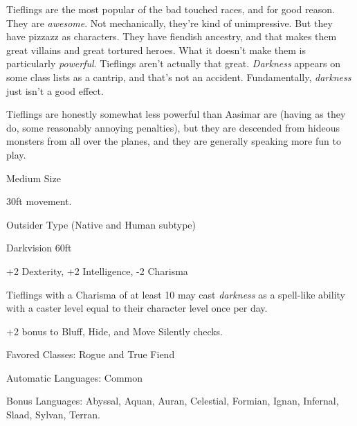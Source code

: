 
Tieflings are the most popular of the bad touched races, and for good reason. They are \textit{awesome}. Not mechanically, they're kind of unimpressive. But they have pizzazz as characters. They have fiendish ancestry, and that makes them great villains and great tortured heroes. What it doesn't make them is particularly \textit{powerful}. Tieflings aren't actually that great. \textit{Darkness} appears on some class lists as a cantrip, and that's not an accident. Fundamentally, \textit{darkness} just isn't a good effect. 

Tieflings are honestly somewhat less powerful than Aasimar are (having as they do, some reasonably annoying penalties), but they are descended from hideous monsters from all over the planes, and they are generally speaking more fun to play.

\begin{itemize*}
\item Medium Size
\item 30ft movement.
\item Outsider Type (Native and Human subtype)
\item Darkvision 60ft
\item +2 Dexterity, +2 Intelligence, -2 Charisma
\item Tieflings with a Charisma of at least 10 may cast \textit{darkness} as a spell-like ability with a caster level equal to their character level once per day.
\item +2 bonus to Bluff, Hide, and Move Silently checks.
\item Favored Classes: Rogue and True Fiend
\item Automatic Languages: Common
\item Bonus Languages: Abyssal, Aquan, Auran, Celestial, Formian, Ignan, Infernal, Slaad, Sylvan, Terran.
\end{itemize*}
